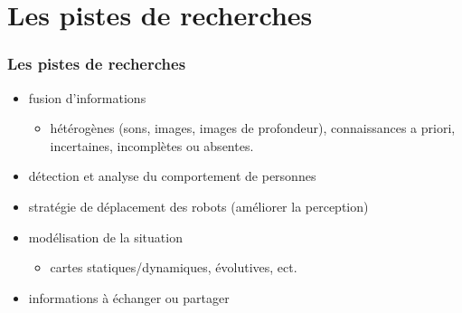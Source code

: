 \documentclass[usepdftitle=false, xcolor=dvipsnames, 12, c]{beamer}
\begin{document}
 \section{Les pistes de recherches}
\begin{frame}
  \frametitle{Les pistes de recherches}
  \begin{itemize}
   \item fusion d'informations 
   \begin{itemize}
     \item[] hétérogènes (sons, images, images de profondeur), connaissances a priori, incertaines, incomplètes ou absentes.
   \end{itemize}
   \item détection et analyse du comportement de personnes 
   \item stratégie de déplacement des robots (améliorer la perception)
   \item modélisation de la situation
   \begin{itemize}
     \item[] cartes statiques/dynamiques, évolutives, ect.
   \end{itemize}
   \item informations à échanger ou partager
  \end{itemize}
\end{frame}

% 
\end{document}
